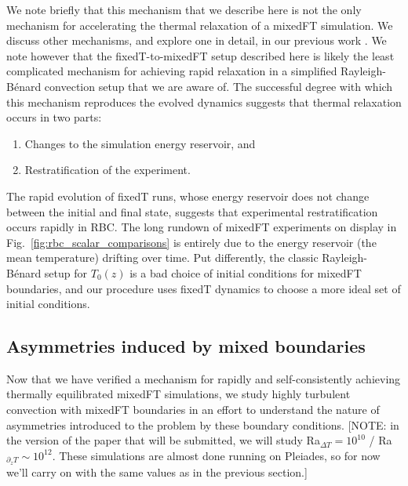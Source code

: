 \documentclass[aps, pre, onecolumn, nofootinbib, notitlepage, groupedaddress, amsfonts, amssymb, amsmath, longbibliography, superscriptaddress]{revtex4-1}
\newcommand{\RB}{Rayleigh-B\'{e}nard }
\begin{document}
We note briefly that this mechanism that we describe here is not the only mechanism for accelerating the thermal relaxation of a mixedFT simulation.
We discuss other mechanisms, and explore one in detail, in our previous work \cite{anders&all2018}.
We note however that the fixedT-to-mixedFT setup described here is likely the least complicated mechanism for achieving rapid relaxation in a simplified \RB convection setup that we are aware of.
The successful degree with which this mechanism reproduces the evolved dynamics suggests that thermal relaxation occurs in two parts:
\begin{enumerate}
\item Changes to the simulation energy reservoir, and
\item Restratification of the experiment.
\end{enumerate}
The rapid evolution of fixedT runs, whose energy reservoir does not change between the initial and final state, suggests that experimental restratification occurs rapidly in RBC. 
The long rundown of mixedFT experiments on display in Fig.~\ref{fig:rbc_scalar_comparisons} is entirely due to the energy reservoir (the mean temperature) drifting over time.
Put differently, the classic \RB setup for $T_0(z)$ is a bad choice of initial conditions for mixedFT boundaries, and our procedure uses fixedT dynamics to choose a more ideal set of initial conditions.

\subsection{Asymmetries induced by mixed boundaries}
\label{sec:asymmetries}
Now that we have verified a mechanism for rapidly and self-consistently achieving thermally equilibrated mixedFT simulations, we study highly turbulent convection with mixedFT boundaries in an effort to understand the nature of asymmetries introduced to the problem by these boundary conditions.
[NOTE: in the version of the paper that will be submitted, we will study Ra$_{\Delta T} = 10^{10}$ / Ra$_{\partial_z T} \sim 10^{12}$. These simulations are almost done running on Pleiades, so for now we'll carry on with the same values as in the previous section.]
\end{document}
